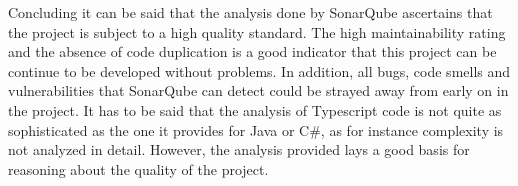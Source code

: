 Concluding it can be said that the analysis done by SonarQube ascertains that the project is subject to a high quality standard. The high maintainability rating and the absence of code duplication is a good indicator that this project can be continue to be developed without problems. In addition, all bugs, code smells and vulnerabilities that SonarQube can detect could be strayed away from early on in the project. It has to be said that the analysis of Typescript code is not quite as sophisticated as the one it provides for Java or C\#, as for instance complexity is not analyzed in detail. However, the analysis provided lays a good basis for reasoning about the quality of the project.  
